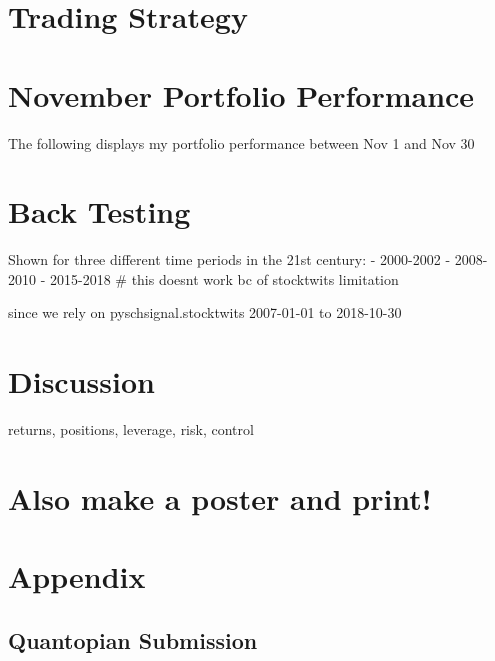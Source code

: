 \documentclass[11pt,]{article}
\begin{document}
\hypertarget{trading-strategy-1}{%
\section{Trading Strategy}\label{trading-strategy-1}}

\hypertarget{november-portfolio-performance}{%
\section{November Portfolio
Performance}\label{november-portfolio-performance}}

The following displays my portfolio performance between Nov 1 and Nov 30

\hypertarget{back-testing}{%
\section{Back Testing}\label{back-testing}}

Shown for three different time periods in the 21st century: - 2000-2002
- 2008-2010 - 2015-2018 \# this doesnt work bc of stocktwits limitation

since we rely on pyschsignal.stocktwits 2007-01-01 to 2018-10-30

\hypertarget{discussion}{%
\section{Discussion}\label{discussion}}

returns, positions, leverage, risk, control

\hypertarget{also-make-a-poster-and-print}{%
\section{Also make a poster and
print!}\label{also-make-a-poster-and-print}}

\hypertarget{appendix}{%
\section{Appendix}\label{appendix}}

\hypertarget{quantopian-submission}{%
\subsection{Quantopian Submission}\label{quantopian-submission}}
\end{document}
